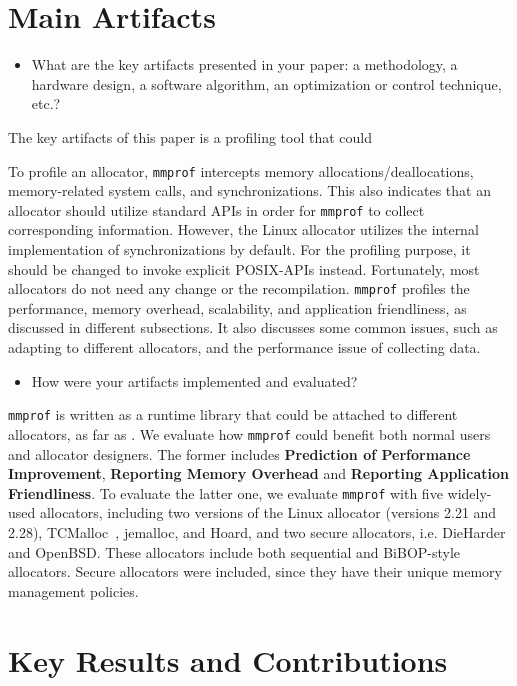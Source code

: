 \documentclass[pageno]{jpaper}
\newcommand{\MP}{\texttt{mmprof}}
\begin{document}
\section{Main Artifacts}
\label{sec:main-artifacts}

\begin{itemize}
\item What are the key artifacts presented in your paper: a
  methodology, a hardware design, a software algorithm, an
  optimization or control technique, etc.?
\end{itemize}

The key artifacts of this paper is a profiling tool that could 

\noindent
To profile an allocator, \MP{} intercepts memory allocations/deallocations, memory-related system calls, and synchronizations. This also indicates that an allocator should utilize standard APIs in order for \MP{} to collect corresponding information. However, the Linux allocator utilizes the internal implementation of synchronizations by default. For the profiling purpose, it should be changed to invoke explicit POSIX-APIs instead. Fortunately, most allocators do not need any change or the recompilation.  \MP{} profiles the performance, memory overhead, scalability, and application friendliness, as discussed in different subsections. It also discusses some common issues, such as adapting to different allocators, and the performance issue of collecting data. 

\begin{itemize}
  \item How were your artifacts implemented and evaluated? 
\end{itemize}

\noindent
\MP{} is written as a runtime library that could be attached to different allocators, as far as . 
We evaluate how \MP{} could benefit both normal users and allocator designers. 
The former includes \textbf{Prediction of Performance Improvement}, \textbf{Reporting Memory Overhead} and \textbf{Reporting Application Friendliness}. 
To evaluate the latter one, we evaluate \MP{} with five widely-used allocators, including two versions of the Linux allocator (versions 2.21 and 2.28), TCMalloc~\cite{tcmalloc}, jemalloc, and Hoard, and two secure allocators, i.e. DieHarder and OpenBSD. These allocators include both sequential and BiBOP-style allocators. Secure allocators were included, since they have their unique memory management policies. 


\section{Key Results and Contributions}
\label{sec:key-contributions}
\end{document}
